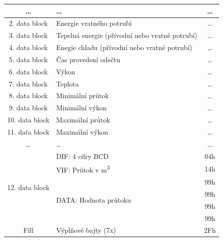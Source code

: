 \begin{table}[!ht]
{\begin{tabular}{|c|l|c|}
\ldots              & \ldots                     & \ldots  \\ \hline
2. data block                  & Energie vratného potrubí & \ldots  \\ \hline
3. data block                  & Tepelná energie (přívodní nebo vratné potrubí) & \ldots  \\ \hline
4. data block                  & Enegie chladu (přívodní nebo vratné potrubí) &\ldots  \\ \hline
5. data block                 & Čas provedení odečtu & \ldots  \\ \hline
6. data block                  & Výkon & \ldots  \\ \hline
7. data block                  & Teplota & \ldots  \\ \hline
8. data block                  & Minimální průtok & \ldots \\ \hline
9. data block                  & Minimální výkon & \ldots  \\ \hline
10. data block                 & Maximální průtok & \ldots  \\ \hline
11. data block                 & Maximální výkon & \ldots  \\ \hline
\ldots                 & \ldots                     & \ldots  \\ \hline
\multirow{6}{*}{12. data block}               & DIF: 4 cifry BCD   & 04h \\ \cline{2-3}
              & VIF: Průtok v m\textsuperscript{3}      & 14h \\ \cline{2-3}
               & \multirow{4}{*}{DATA: Hodnota průtoku}       & 99h \\ \cline{3-3}
               &      & 99h \\ \cline{3-3}
               &        & 99h \\ \cline{3-3}
               &       & 99h \\ \hline
Fill              & Výplňové bajty (7x)       & 2Fh \\ \hline \hline
\end{tabular}}
\end{table}

\newpage
	
	
